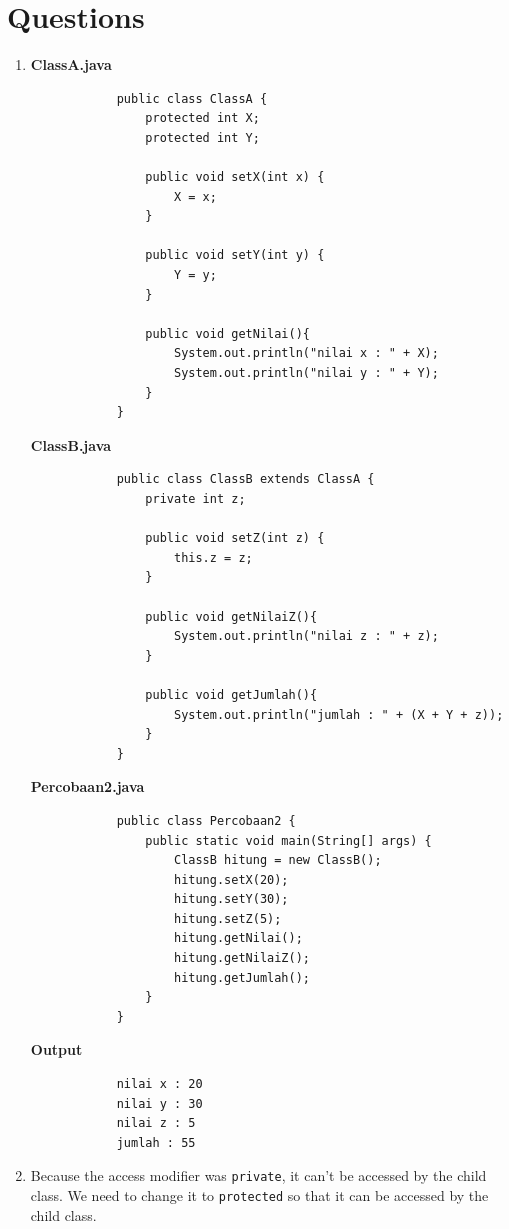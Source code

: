 \documentclass[12pt,titlepage]{article}
\begin{document}
\section{Questions}
\begin{enumerate}
    \item {
        \textbf{ClassA.java}
        \begin{verbatim}
            public class ClassA {
                protected int X;
                protected int Y;

                public void setX(int x) {
                    X = x;
                }

                public void setY(int y) {
                    Y = y;
                }

                public void getNilai(){
                    System.out.println("nilai x : " + X);
                    System.out.println("nilai y : " + Y);
                }
            }
        \end{verbatim}
        \textbf{ClassB.java}
        \begin{verbatim}
            public class ClassB extends ClassA {
                private int z;

                public void setZ(int z) {
                    this.z = z;
                }

                public void getNilaiZ(){
                    System.out.println("nilai z : " + z);
                }

                public void getJumlah(){
                    System.out.println("jumlah : " + (X + Y + z));
                }
            }
        \end{verbatim}
        \textbf{Percobaan2.java}
        \begin{verbatim}
            public class Percobaan2 {
                public static void main(String[] args) {
                    ClassB hitung = new ClassB();
                    hitung.setX(20);
                    hitung.setY(30);
                    hitung.setZ(5);
                    hitung.getNilai();
                    hitung.getNilaiZ();
                    hitung.getJumlah();
                }
            }
        \end{verbatim}
        \textbf{Output}
        \begin{verbatim}
            nilai x : 20
            nilai y : 30
            nilai z : 5
            jumlah : 55
        \end{verbatim}
    }
    \item {
        Because the access modifier was \texttt{private}, it can't be accessed by the child class.
        We need to change it to \texttt{protected} so that it can be accessed by the child class.
    }
\end{enumerate}
\end{document}

